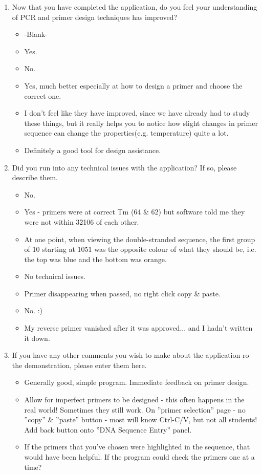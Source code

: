 \documentclass[a4paper]{article}
\begin{document}
\begin{enumerate}
	\item{Now that you have completed the application, do you feel your understanding of PCR and primer design techniques has
			improved?}
	\begin{itemize}
		item{I think it would if this was my first time doing this.}
		\item{-Blank-}
		\item{Yes.}
		\item{No.}
		\item{Yes, much better especially at how to design a primer and choose the correct one.}
		\item{I don't feel like they have improved, since we have already had to study these things, but it really helps you to
				notice how slight changes in primer sequence can change the properties(e.g. temperature) quite a lot.}
		\item{Definitely a good tool for design assistance.}
	\end{itemize}
	
	\item{Did you run into any technical issues with the application? If so, please describe them.}
	\begin{itemize}
		\item{No.}
		\item{Yes - primers were at correct Tm (64  \& 62) but software told me they were not within 3\u2106 of each other.}
		\item{At one point, when viewing the double-stranded sequence, the first group of 10 starting at 1051 was the opposite colour of what they should 					be, i.e. the top was blue and the bottom was orange.}
		\item{No technical issues.}
		\item{Primer disappearing when passed, no right click copy  \& paste.}
		\item{No. :)}
		\item{My reverse primer vanished after it was approved... and I hadn't written it down.}
	\end{itemize}
	
	\item{If you have any other comments you wish to make about the application ro the demonstration, please enter them here.}
	\begin{itemize}
		\item{Generally good, simple program. Immediate feedback on primer design.}
		\item{Allow for imperfect primers to be designed - this often happens in the real world! Sometimes they still work.
				On ''primer selection'' page - no ''copy''  \& ''paste'' button - most will know Ctrl-C/V, but not all students!
				Add back button onto ''DNA Sequence Entry'' panel.}
		\item{If the primers that you've chosen were highlighted in the sequence, that would have been helpful. If the program
				could check the primers one at a time?}
		
	\end{itemize}
\end{enumerate}
\end{document}
